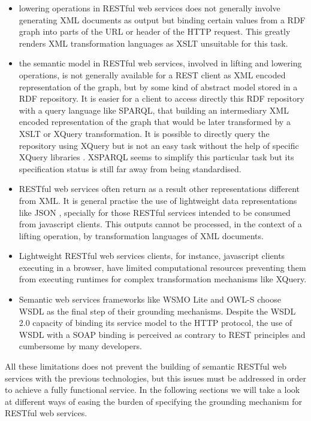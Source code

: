 \begin{itemize}
  \item lowering operations in RESTful web services does not generally involve generating XML documents as output but binding certain values from a RDF graph into parts of the URL or header of the HTTP request. This greatly renders XML transformation languages as XSLT unsuitable for this task.
 \item the semantic model in RESTful web services, involved in lifting and lowering operations, is not generally available for a REST client as XML encoded representation of the graph, but by some kind of abstract model stored in a RDF repository. It is easier for a client to access directly this RDF repository with a query language like SPARQL, that building an intermediary XML encoded representation of the graph that would be later transformed by a XSLT or XQuery transformation. It is possible to directly query the repository using XQuery but is not an easy task without the help of specific XQuery libraries \cite{xquery}. XSPARQL seems to simplify this particular task but its specification status is still far away from being standardised.
\item RESTful web services often return as a result other representations different from XML. It is general practise the use of lightweight data representations like JSON \cite{json}, specially for those RESTful services intended to be consumed from javascript clients. This outputs cannot be processed, in the context of a lifting operation, by transformation languages of XML documents.
\item Lightweight RESTful web services clients, for instance, javascript clients executing in a browser, have limited computational resources preventing them from executing runtimes for complex transformation mechanisms like XQuery.
\item Semantic web services frameworks like WSMO Lite and OWL-S choose WSDL as the final step of their grounding mechanisms. Despite the WSDL 2.0 capacity of binding its service model to the HTTP protocol, the use of WSDL with a SOAP binding is perceived as contrary to REST principles and cumbersome by many developers.
\end{itemize}

All these limitations does not prevent the building of semantic RESTful web services with the previous technologies, but this issues must be addressed in order to achieve a fully functional service. In the following sections we will take a look at different ways of easing the burden of specifying the grounding mechanism for RESTful web services.

